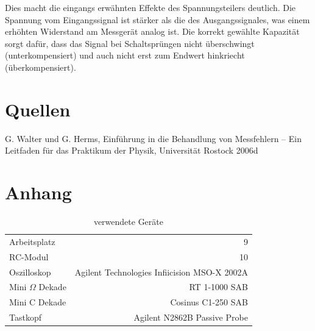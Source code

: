 \documentclass[10pt,a4paper]{scrartcl}
\begin{document}
Dies macht die eingangs erwähnten Effekte des Spannungsteilers deutlich.
Die Spannung vom Eingangssignal ist stärker als die des Ausgangssignales,
was einem erhöhten Widerstand am Messgerät analog ist.
Die korrekt gewählte Kapazität sorgt dafür,
dass das Signal bei Schaltsprüngen nicht überschwingt (unterkompensiert) und
auch nicht erst zum Endwert hinkriecht (überkompensiert).

\pagebreak
\section {Quellen}
\begin{thebibliography}{999}
 G. Walter und G. Herms, Einführung in die Behandlung von Messfehlern -- Ein Leitfaden für das Praktikum der Physik, Universität Rostock 2006d
\end{thebibliography}

\section {Anhang}

\begin{table}[ht!]
    \centering
    \caption{verwendete Geräte} \label{tab:devices}
    \begin{tabular}{lr}
        Arbeitsplatz & 9\\
        RC-Modul&10\\
        Oszilloskop&Agilent Technologies Infiicision MSO-X 2002A\\
        Mini $\Omega$ Dekade&RT 1-1000 SAB\\
        Mini C Dekade&Cosinus C1-250 SAB\\
        Tastkopf&Agilent N2862B Passive Probe
    \end{tabular}
\end{table}
\end{document}
